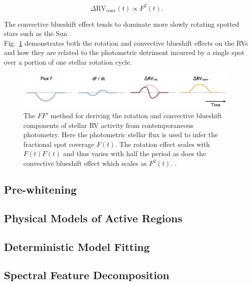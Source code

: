 \begin{equation}
  \Delta \text{RV}_{\text{conv}}(t) \propto F^2(t).
\end{equation}

\noindent The convective blueshift effect tends to dominate more slowly rotating spotted
stars such as the Sun \citep{haywood16}. \\

Fig.~\ref{fig:ffp} demonstrates both the rotation and
convective blueshift effects on the RVs and how they are related to the photometric detriment
incurred by a single spot over a portion of one stellar rotation cycle.

\begin{figure}
  \centering
  \includegraphics[width=0.8\hsize]{figures/ffp.png}
  \caption{The $FF'$ method for deriving the rotation and convective blueshift components
    of stellar RV activity from contemporaneous photometry. Here the photometric stellar flux
    is used to infer the fractional spot coverage $F(t)$. The rotation effect scales with
    $F(t) \dot{F}(t)$ and thus varies with half the period as does the convective blueshift
    effect which scales as $F^2(t)$. \citep[Image credit:][]{haywood15}.}
  \label{fig:ffp}
\end{figure}

\subsection{Pre-whitening}
\citep{queloz09}


\subsection{Physical Models of Active Regions}
\citep{dumusque14}

\subsection{Deterministic Model Fitting}
\citep{boisse11,sarkis18}

\subsection{Spectral Feature Decomposition}
\citep{davis17}


